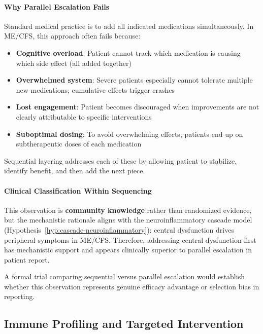 \begin{observation}
\paragraph{Why Parallel Escalation Fails}

Standard medical practice is to add all indicated medications simultaneously. In ME/CFS, this approach often fails because:

\begin{itemize}
    \item \textbf{Cognitive overload}: Patient cannot track which medication is causing which side effect (all added together)
    \item \textbf{Overwhelmed system}: Severe patients especially cannot tolerate multiple new medications; cumulative effects trigger crashes
    \item \textbf{Lost engagement}: Patient becomes discouraged when improvements are not clearly attributable to specific interventions
    \item \textbf{Suboptimal dosing}: To avoid overwhelming effects, patients end up on subtherapeutic doses of each medication
\end{itemize}

Sequential layering addresses each of these by allowing patient to stabilize, identify benefit, and then add the next piece.

\paragraph{Clinical Classification Within Sequencing}

This observation is \textbf{community knowledge} rather than randomized evidence, but the mechanistic rationale aligns with the neuroinflammatory cascade model (Hypothesis~\ref{hyp:cascade-neuroinflammatory}): central dysfunction drives peripheral symptoms in ME/CFS. Therefore, addressing central dysfunction first has mechanistic support and appears clinically superior to parallel escalation in patient report.

A formal trial comparing sequential versus parallel escalation would establish whether this observation represents genuine efficacy advantage or selection bias in reporting.

\end{observation}

\subsection{Immune Profiling and Targeted Intervention}

